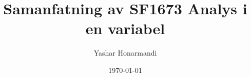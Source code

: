 \documentclass[a4paper, 11pt]{article}
\title{Samanfatning av SF1673 Analys i en variabel}
\author{Yashar Honarmandi}
\date{\today}
\begin{document}
\maketitle

\begin{abstract}
	
\end{abstract}
\end{document}
